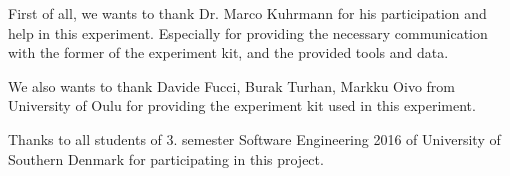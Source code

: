 \documentclass{sig-alternate-05-2015}
\begin{document}
First of all, we wants to thank Dr. Marco Kuhrmann for his participation and help in this experiment. Especially for providing the necessary communication with the former of the experiment kit, and the provided tools and data.

We also wants to thank Davide Fucci, Burak Turhan, Markku Oivo from University of Oulu for providing the experiment kit used in this experiment.

Thanks to all students of 3. semester Software Engineering 2016 of University of Southern Denmark for participating in this project.
\end{document}
